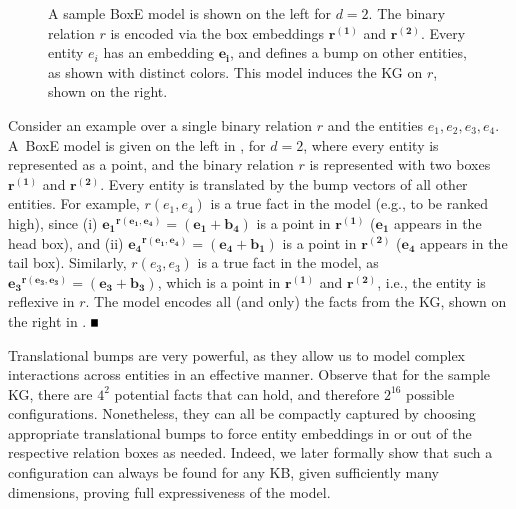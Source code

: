 \documentclass{article}
\begin{document}
\begin{figure}[t!]
\begin{subfigure}{0.4\linewidth}
	\end{subfigure}
	\caption{A sample BoxE model is shown on the left for $d=2$. The binary relation $r$  is encoded via the box embeddings $\mathbf{r^{(1)}}$ and $\mathbf{r^{(2)}}$. Every entity $e_i$ has an embedding $\mathbf{e_i}$, and defines a bump on other entities, as shown with distinct colors. This model induces the KG on $r$, shown on the right.}
	\label{fig:BoxEBumps}
\end{figure}
\begin{example}
{\rm 
Consider an example over a single binary relation $r$ and the entities $e_1, e_2, e_3, e_4$.
A~BoxE model is given on the left in  , for $d=2$, where every entity is represented as a point, and the binary relation $r$ is represented with two boxes $\bm{r^{(1)}}$ and $\bm{r^{(2)}}$.
Every entity is translated by the bump vectors of all other entities. For example, $r(e_1,e_4)$ is a true fact in the model (e.g., to be ranked high), since (i)  $\bm{e_1}^{\bm{r(e_1,e_4)}}=(\bm{e_1}+\bm{b_4})$ is a point in $\bm{r^{(1)}}$ ($\bm{e_1}$ appears in the head box), and (ii) $\bm{e_4}^{\bm{r(e_1,e_4)}}=(\bm{e_4}+\bm{b_1})$ is a point in $\bm{r^{(2)}}$ ($\bm{e_4}$ appears in the tail box). Similarly, $r(e_3, e_3)$ is a true fact in the model, as  ${\bm{e_3}^{\bm{r(e_3,e_3)}}=(\bm{e_3}+\bm{b_3})}$, which is a point in $\bm{r^{(1)}}$ and $\bm{r^{(2)}}$, i.e., the entity is reflexive in $r$. The model encodes all (and only) the facts from the KG, shown on the right in . \hfill$\rule{0.5em}{0.5em}$


}
\end{example}

Translational bumps are very powerful, as they allow us to model complex interactions across entities in an effective manner. Observe that for the sample KG, there are $4^2$ potential facts that can hold, and therefore $2^{16}$ possible configurations. Nonetheless, they can all be compactly captured by choosing appropriate translational bumps to force entity embeddings in or out of the respective relation boxes as needed. Indeed, we later formally show that such a configuration can always be found for any KB, given sufficiently many dimensions, proving full expressiveness of the model.
\end{document}
